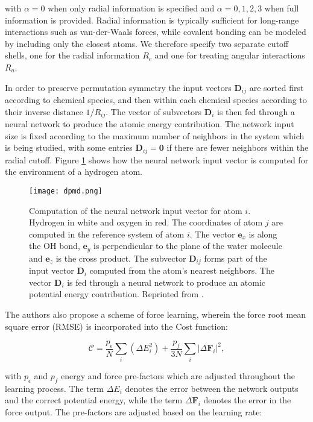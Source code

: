 with $\alpha = 0$ when only radial information is specified
and $\alpha = 0,1,2,3$ when full information is provided. Radial information
is typically sufficient for long-range interactions such as van-der-Waals
forces, while covalent bonding can be modeled by including
only the closest atoms. We therefore specify two separate
cutoff shells, one for the radial information $R_c$ and one
for treating angular interactions $R_a$.
\par
In order to preserve permutation symmetry the input vectors $\bm{D}_{ij}$
are sorted first according to chemical species, and then within
each chemical species according to their inverse distance $1 / R_{ij}$.
The vector of subvectors $\bm{D}_i$ is then fed through a neural
network to produce the atomic energy contribution.
The network input size is fixed according to the maximum number of neighbors
in the system which is being studied, with some entries $\bm{D}_{ij} = \bm{0}$
if there are fewer neighbors within the radial cutoff.
Figure \ref{fig:dpmd} shows how the neural network input vector
is computed for the environment of a hydrogen atom.

\begin{figure}[H]
    \centering
    \texttt{[image: dpmd.png]}
    \caption{Computation of the neural network input vector for atom $i$.
        Hydrogen in white and oxygen in red.
        The coordinates of atom $j$ are computed in the 
        reference system of atom $i$.
        The vector $\bm{e}_x$ is along the OH bond, $\bm{e}_y$ is perpendicular
        to the plane of the water molecule and $\bm{e}_z$ is the cross product.
        The subvector $\bm{D}_{ij}$ forms part of the input vector
        $\bm{D}_i$ computed from the atom's nearest neighbors.
        The vector $\bm{D}_i$ is fed through a neural network
        to produce an atomic potential energy contribution.
        Reprinted from \parencite[Zhang et al.]{PhysRevLett.120.143001}.}
    \label{fig:dpmd}
\end{figure}

The authors also propose a scheme of force learning, wherein
the force root mean square error (RMSE) is incorporated into the Cost function:

\begin{equation}
    \mathcal{C} = \frac{p_{\epsilon}}{N} \sum_i
    \left( \Delta E_i^2 \right)
    + \frac{p_{f}}{3N} \sum_i \left| \Delta \bm{F}_i \right|^2,
\end{equation}

with $p_{\epsilon}$ and $p_{f}$ energy and force pre-factors which are
adjusted throughout the learning process. The term $\Delta E_i$
denotes the error between the network outputs
and the correct potential energy, while the term $\Delta \bm{F}_i$
denotes the error in the force output.
The pre-factors are adjusted based on the learning rate:

